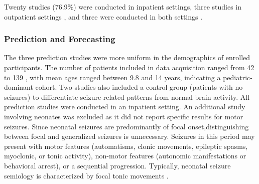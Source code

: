 Twenty studies (76.9\%) were conducted in inpatient settings, three studies in outpatient settings \cite{Chowdhury2022-bi,Wang2022-lt,Dong2022-oo}, and three were conducted in both settings \cite{Wang2025-my,Regalia2019-ch,Nasseri2021-xn}. 

\subsubsection{Prediction and Forecasting}
The three prediction studies were more uniform in the demographics of enrolled participants. The number of patients included in data acquisition ranged from 42 \cite{Vieluf2023-ta} to 139 \cite{Vieluf2023-zv}, with mean ages ranged between 9.8 \cite{Meisel2020-ii} and 14 \cite{Vieluf2023-ta} years, indicating a pediatric-dominant cohort. Two studies \cite{Vieluf2023-zv,Vieluf2023-ta} also included a control group (patients with no seizures) to differentiate seizure-related patterns from normal brain activity. All prediction studies were conducted in an inpatient setting. An additional study \cite{Chen2023-ns} involving neonates was excluded as it did not report specific results for motor seizures. Since neonatal seizures are predominantly of focal onset,distinguishing between focal and generalized seizures is unnecessary. Seizures in this period may present with motor features (automatisms, clonic movements, epileptic spasms, myoclonic, or tonic activity), non-motor features (autonomic manifestations or behavioral arrest), or a sequential progression. Typically, neonatal seizure semiology is characterized by focal tonic movements \cite{Ziobro24-neo}.
